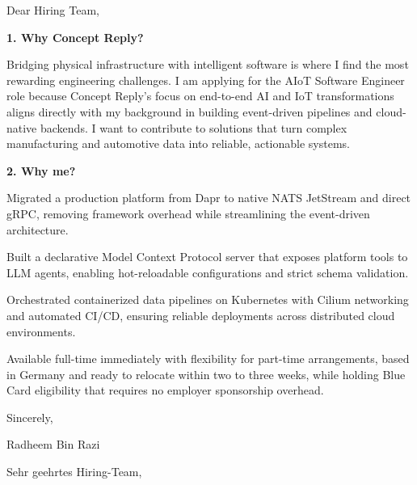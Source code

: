 \documentclass[11pt,a4paper]{coverletter}
\begin{document}

\opening{Dear Hiring Team,}

\vspace{8pt}\noindent\textbf{1. Why Concept Reply?}\par\vspace{3pt}

Bridging physical infrastructure with intelligent software is where I find the most rewarding engineering challenges. I am applying for the AIoT Software Engineer role because Concept Reply’s focus on end-to-end AI and IoT transformations aligns directly with my background in building event-driven pipelines and cloud-native backends. I want to contribute to solutions that turn complex manufacturing and automotive data into reliable, actionable systems.

\vspace{8pt}\noindent\textbf{2. Why me?}\par\vspace{3pt}

\bullets

  \item Migrated a production platform from Dapr to native NATS JetStream and direct gRPC, removing framework overhead while streamlining the event-driven architecture.

  \item Built a declarative Model Context Protocol server that exposes platform tools to LLM agents, enabling hot-reloadable configurations and strict schema validation.

  \item Orchestrated containerized data pipelines on Kubernetes with Cilium networking and automated CI/CD, ensuring reliable deployments across distributed cloud environments.

\bulletsend

Available full-time immediately with flexibility for part-time arrangements, based in Germany and ready to relocate within two to three weeks, while holding Blue Card eligibility that requires no employer sponsorship overhead.

\closing{Sincerely,}{Radheem Bin Razi}

\clearpage
{}


\opening{Sehr geehrtes Hiring-Team,}
\end{document}
